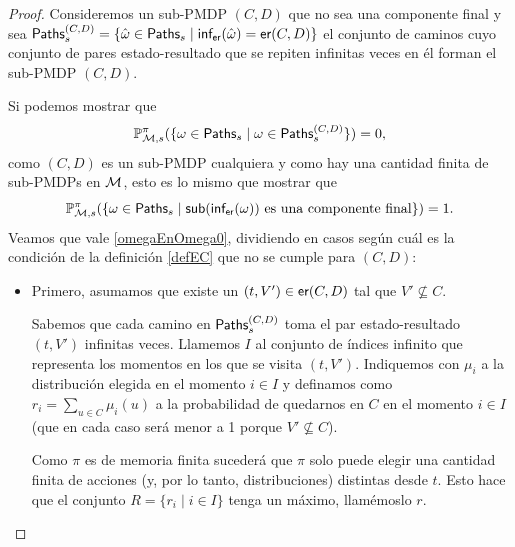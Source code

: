 \begin{proof}
	Consideremos un sub-PMDP $(C,D)$ que no sea una componente final y sea $\textsf{Paths}_s^{(C,D)} = \{\hat{\omega} \in \textsf{Paths}_s \mid \textsf{inf}_\textsf{er}(\hat{\omega}) = \textsf{er}(C, D)\}$ el conjunto de caminos cuyo conjunto de pares estado-resultado que se repiten infinitas veces en él forman el sub-PMDP $(C,D)$.

	Si podemos mostrar que
	\begin{equation}\label{omegaEnOmega0}
		\mathbb{P}^\pi_{\mathcal{M}, s}(\{ \omega \in \textsf{Paths}_s \mid \omega \in \textsf{Paths}_s^{(C,D)}\}) = 0,
	\end{equation}
	como $(C,D)$ es un sub-PMDP cualquiera y como hay una cantidad finita de sub-PMDPs en $\mathcal{M}$, esto es lo mismo que mostrar que
	$$\mathbb{P}^\pi_{\mathcal{M}, s}(\{ \omega \in \textsf{Paths}_s \mid \textsf{sub}(\textsf{inf}_\textsf{er}(\omega)) \text{ es una componente final}\}) = 1.$$
	Veamos que vale \ref{omegaEnOmega0}, dividiendo en casos según cuál es la
	condición de la definición \ref{defEC} que no se cumple para $(C,D)$:

	\begin{itemize}
		\item Primero, asumamos que existe un $(t, V') \in \textsf{er}(C,D)$ tal que $V' \nsubseteq
			      C$.



		      Sabemos que cada camino en $\textsf{Paths}_s^{(C,D)}$ toma el par estado-resultado $(t,
			      V')$ infinitas veces. Llamemos $I$ al conjunto de índices infinito que
		      representa los momentos en los que se visita $(t, V')$. Indiquemos con $\mu_i$
		      a la distribución elegida en el momento $i \in I$ y definamos como $r_i =
			      \sum_{u \in C} \mu_i(u)$ a la probabilidad de quedarnos en $C$ en el momento $i
			      \in I$ (que en cada caso será menor a 1 porque $V' \nsubseteq C$). %

		      Como $\pi$ es de memoria finita sucederá que $\pi$ solo puede elegir una
		      cantidad finita de acciones (y, por lo tanto, distribuciones) distintas desde
		      $t$. Esto hace que el conjunto $R = \{r_i \mid i \in I\}$ tenga un máximo,
		      llamémoslo $r$.


\end{itemize}
\end{proof}

